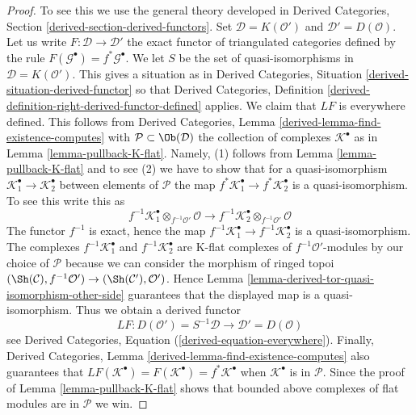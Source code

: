 \begin{proof}
To see this we use the general theory developed in
Derived Categories, Section \ref{derived-section-derived-functors}.
Set $\mathcal{D} = K(\mathcal{O}')$ and $\mathcal{D}' = D(\mathcal{O})$.
Let us write $F : \mathcal{D} \to \mathcal{D}'$ the exact functor
of triangulated categories defined by the rule
$F(\mathcal{G}^\bullet) = f^*\mathcal{G}^\bullet$.
We let $S$ be the set of quasi-isomorphisms in
$\mathcal{D} = K(\mathcal{O}')$.
This gives a situation as in
Derived Categories, Situation \ref{derived-situation-derived-functor}
so that
Derived Categories, Definition
\ref{derived-definition-right-derived-functor-defined}
applies. We claim that $LF$ is everywhere defined.
This follows from
Derived Categories, Lemma \ref{derived-lemma-find-existence-computes}
with $\mathcal{P} \subset \Ob(\mathcal{D})$ the collection
of complexes $\mathcal{K}^\bullet$ as in
Lemma \ref{lemma-pullback-K-flat}. Namely, (1) follows from
Lemma \ref{lemma-pullback-K-flat}
and to see (2) we have to show that for a quasi-isomorphism
$\mathcal{K}_1^\bullet  \to \mathcal{K}_2^\bullet$ between
elements of $\mathcal{P}$ the map
$f^*\mathcal{K}_1^\bullet  \to f^*\mathcal{K}_2^\bullet$ is a
quasi-isomorphism. To see this write this as
$$
f^{-1}\mathcal{K}_1^\bullet \otimes_{f^{-1}\mathcal{O}'} \mathcal{O}
\longrightarrow
f^{-1}\mathcal{K}_2^\bullet \otimes_{f^{-1}\mathcal{O}'} \mathcal{O}
$$
The functor $f^{-1}$ is exact, hence the map
$f^{-1}\mathcal{K}_1^\bullet  \to f^{-1}\mathcal{K}_2^\bullet$ is a
quasi-isomorphism. The complexes
$f^{-1}\mathcal{K}_1^\bullet$ and $f^{-1}\mathcal{K}_2^\bullet$
are K-flat complexes of $f^{-1}\mathcal{O}'$-modules by our choice of
$\mathcal{P}$ because we can consider the morphism of ringed topoi
$(\Sh(\mathcal{C}), f^{-1}\mathcal{O}') \to
(\Sh(\mathcal{C}'), \mathcal{O}')$. Hence
Lemma \ref{lemma-derived-tor-quasi-isomorphism-other-side}
guarantees that the displayed map is a quasi-isomorphism.
Thus we obtain a derived functor
$$
LF :
D(\mathcal{O}') = S^{-1}\mathcal{D}
\longrightarrow
\mathcal{D}' = D(\mathcal{O})
$$
see
Derived Categories, Equation (\ref{derived-equation-everywhere}).
Finally,
Derived Categories, Lemma \ref{derived-lemma-find-existence-computes}
also guarantees that
$LF(\mathcal{K}^\bullet) = F(\mathcal{K}^\bullet) = f^*\mathcal{K}^\bullet$
when $\mathcal{K}^\bullet$ is in $\mathcal{P}$.
Since the proof of
Lemma \ref{lemma-pullback-K-flat}
shows that bounded above complexes of flat modules are in $\mathcal{P}$
we win.
\end{proof}

